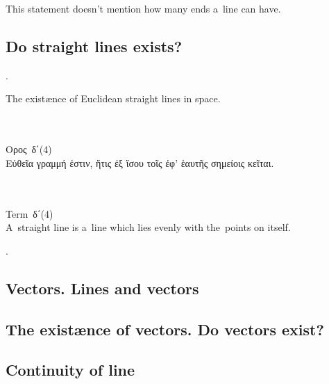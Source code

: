 This statement doesn’t mention how many ends a~line can have.

\subsection{Do straight lines exists?}

.

\noindent
The existænce of
Euclidean straight lines
in space.

{\small
\setlength{\parindent}{0pt}

\nopagebreak%
\begin{multicols}{2}
%
\\
\\[.3em]
\textgreek{Ορος}~\textgreek{δ΄}\:(4)\\[.1em]
\textgreek{Εὐθεῖα γραμμή ἐστιν, ἥτις ἐξ ἴσου τοῖς ἐφ' ἑαυτῆς σημείοις κεῖται.}

\columnbreak
%
\\
\\[.3em]
Term~\textgreek{δ΄}\:(4)\\[.1em]
A~straight line is a~line which lies evenly with the~points on itself.
%
\end{multicols}
\par}

.

\subsection{Vectors. Lines and vectors}

\subsection{The existænce of vectors. Do vectors exist?}

\subsection{Continuity of line}


